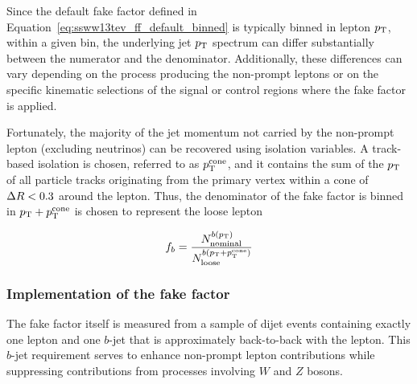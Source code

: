 Since the default fake factor defined in Equation~\ref{eq:ssww13tev_ff_default_binned} is typically binned in lepton $p_{\mathrm{T}}$, within a given bin, the underlying jet $p_{\mathrm{T}}$ spectrum can differ substantially between the numerator and the denominator.
Additionally, these differences can vary depending on the process producing the non-prompt leptons or on the specific kinematic selections of the signal or control regions where the fake factor is applied.

Fortunately, the majority of the jet momentum not carried by the non-prompt lepton (excluding neutrinos) can be recovered using isolation variables.
A track-based isolation is chosen, referred to as $p_{\mathrm{T}}^{\textrm{cone}}$, and it contains the sum of the $p_{\mathrm{T}}$ of all particle tracks originating from the primary vertex within a cone of $\Delta R < 0.3$ around the lepton.
Thus, the denominator of the fake factor is binned in $p_{\mathrm{T}}+p_{\mathrm{T}}^{\textrm{cone}}$ is chosen to represent the loose lepton

\begin{equation}
f_b = \frac{N_{\textrm{nominal}}^{b(\pt)}}{N_{\textrm{loose}}^{b(\ptptcone)}}
\label{eq:ssww13tev_ff_ptcone_binned}
\end{equation}

%
\subsubsection{Implementation of the fake factor}\label{ssww13tev:ff_implementation}
The fake factor itself is measured from a sample of dijet events containing exactly one lepton and one $b$-jet that is approximately back-to-back with the lepton.
This $b$-jet requirement serves to enhance non-prompt lepton contributions while suppressing contributions from processes involving $W$ and $Z$ bosons.

